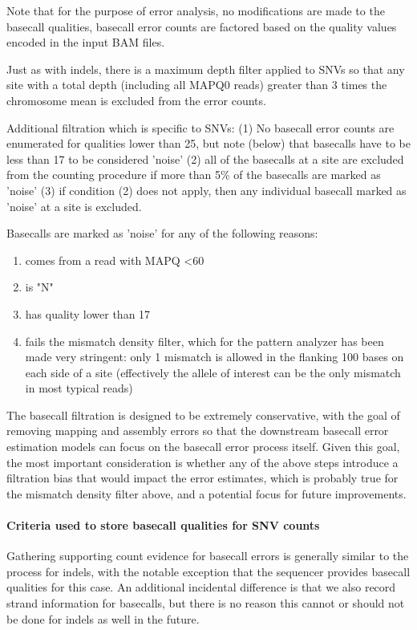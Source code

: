 \documentclass{article}
\begin{document}
Note that for the purpose of error analysis, no modifications are made to the basecall qualities, basecall error counts are factored based on the quality values encoded in the input BAM files.

Just as with indels, there is a maximum depth filter applied to SNVs so that any site with a total depth (including all MAPQ0 reads) greater than 3 times the chromosome mean is excluded from the error counts.

Additional filtration which is specific to SNVs: (1) No basecall error counts are enumerated for qualities lower than 25, but note (below) that basecalls have to be less than 17 to be considered 'noise' (2) all of the basecalls at a site are excluded from the counting procedure if more than 5\% of the basecalls are marked as 'noise' (3) if condition (2) does not apply, then any individual basecall marked as 'noise' at a site is excluded.

Basecalls are marked as 'noise' for any of the following reasons:

\begin{enumerate}
\item comes from a read with MAPQ \textless 60
\item is "N"
\item has quality lower than 17
\item fails the mismatch density filter, which for the pattern analyzer has been made very stringent: only 1 mismatch is allowed in the flanking 100 bases on each side of a site (effectively the allele of interest can be the only mismatch in most typical reads)
\end{enumerate}

The basecall filtration is designed to be extremely conservative, with the goal of removing mapping and assembly errors so that the downstream basecall error estimation models can focus on the basecall error process itself. Given this goal, the most important consideration is whether any of the above steps introduce a filtration bias that would impact the error estimates, which is probably true for the mismatch density filter above, and a potential focus for future improvements.


\paragraph{Criteria used to store basecall qualities for SNV counts}

Gathering supporting count evidence for basecall errors is generally similar to the process for indels, with the notable exception that the sequencer provides basecall qualities for this case. An additional incidental difference is that we also record strand information for basecalls, but there is no reason this cannot or should not be done for indels as well in the future.
\end{document}
